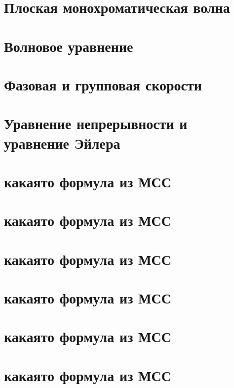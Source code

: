 \newcommand{\colontitulAutors}{astronom\_v\_cube}
\newcommand{\colontitulYear}{2023}
\newcommand{\colontitulEducationalSubject}{Физика волновых процессов}
\newcommand{\colontitulTeacher}{Петров Е. Ю.}




	\small
	\begin{multicols*}{2}
		\section{Плоская монохроматическая волна}

		\section{Волновое уравнение}

		\section{Фазовая и групповая скорости}

		\section{Уравнение непрерывности и уравнение Эйлера}

		\section{какаято формула из МСС}

		\section{какаято формула из МСС}

		\section{какаято формула из МСС}

		\section{какаято формула из МСС}

		\section{какаято формула из МСС}

		\section{какаято формула из МСС}


\end{multicols*}
